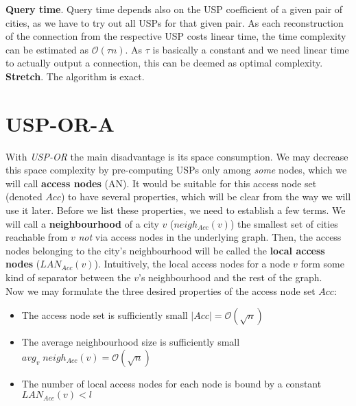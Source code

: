 	\textbf{Query time}. Query time depends also on the USP coefficient of a given pair of cities, as we have to try out all USPs for that given pair. As each reconstruction of the connection from the respective USP costs linear time, the time complexity can be estimated as $\mathcal{O}(\tau n)$. As $\tau$ is basically a constant and we need linear time to actually output a connection, this can be deemed as optimal complexity. \\
	
	\textbf{Stretch}. The algorithm is exact. \\
	    
	    \section{USP-OR-A}
	    
	    With \textit{USP-OR} the main disadvantage is its space consumption. We may decrease this space complexity by pre-computing USPs only among \textit{some} nodes, which we will call \textbf{access nodes} (AN). It would be suitable for this access node set (denoted $Acc$) to have several properties, which will be clear from the way we will use it later. Before we list these properties, we need to establish a few terms. We will call a \textbf{neighbourhood} of a city $v$ ($neigh_{Acc}(v)$) the smallest set of cities reachable from $v$ \textit{not} via access nodes in the underlying graph. Then, the access nodes belonging to the city's neighbourhood will be called the \textbf{local access nodes} ($LAN_{Acc}(v)$). Intuitively, the local access nodes for a node $v$ form some kind of separator between the $v$'s neighbourhood and the rest of the graph.\\
	    
	    Now we may formulate the three desired properties of the access node set $Acc$:
	    \begin{itemize}
	    	\item The access node set is sufficiently small $|Acc| = \mathcal{O}(\sqrt{n})$
	    	\item The average neighbourhood size is sufficiently small $avg_{v} \; neigh_{Acc}(v) = \mathcal{O}(\sqrt{n})$
	    	\item The number of local access nodes for each node is bound by a constant $LAN_{Acc}(v) < l$
	    \end{itemize}
	\hspace{\fill}
	
	    
